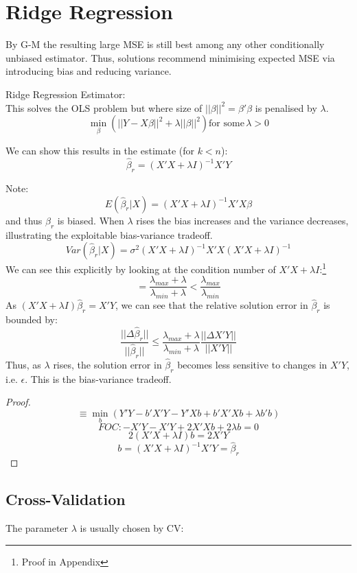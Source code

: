 \documentclass[DIV=14,titlepage=false]{scrreprt}
\begin{document}
\section{Ridge Regression}

By G-M the resulting large MSE is still best among any other conditionally unbiased estimator. Thus, solutions recommend minimising expected MSE via introducing bias and reducing variance.

\begin{definition}Ridge Regression Estimator: \\

    This solves the OLS problem but where size of \(||\beta||^2=\beta'\beta\) is penalised by \(\lambda\).
    \[\operatorname*{min}_{\beta}\left(||Y-X\beta||^2+\lambda||\beta||^2\right) \text{for some} \, \lambda > 0\]

    We can show this results in the estimate (for \(k< n\)):
    \[\hat{\beta}_{r}=(X'X+\lambda I)^{-1}X'Y\]

    Note: \[E(\hat{\beta}_{r}|X)=(X'X+\lambda I)^{-1}X'X\beta\] and thus \(\hat{\beta}_{r}\) is biased. When \(\lambda\) rises the bias increases and the variance decreases, illustrating the exploitable bias-variance tradeoff.
    \[Var(\hat{\beta}_{r}|X)=\sigma^2(X'X+\lambda I)^{-1}X'X(X'X+\lambda I)^{-1}\]
    We can see this explicitly by looking at the condition number of \(X'X+\lambda I\):\footnote[3]{Proof in Appendix}
    \[= \frac{\lambda_{max}+\lambda}{\lambda_{min}+\lambda}<\frac{\lambda_{max}}{\lambda_{min}}\]
    As \((X'X+\lambda I)\hat{\beta}_{r}=X'Y\), we can see that the relative solution error in \(\hat{\beta}_{r}\) is bounded by:
    \[\frac{||\Delta \hat{\beta}_{r}||}{||\hat{\beta}_{r}||} \leq \frac{\lambda_{max}+\lambda}{\lambda_{min}+\lambda}\frac{||\Delta X'Y||}{||X'Y||}\]
    Thus, as \(\lambda\) rises, the solution error in \(\hat{\beta}_{r}\) becomes less sensitive to changes in \(X'Y\), i.e. \(\epsilon\). This is the bias-variance tradeoff.
\end{definition}

\vspace{5mm}
\begin{proof}
     \[\equiv \operatorname*{min}_b (Y'Y - b'X'Y - Y'Xb + b'X'Xb + \lambda b'b)\]
     \[FOC: -X'Y-X'Y+2X'Xb+2\lambda b=0\]
     \[2(X'X+\lambda I)b=2X'Y\]
     \[b=(X'X+\lambda I)^{-1}X'Y=\hat{\beta}_r\]
\end{proof}

\subsection{Cross-Validation}
The parameter \(\lambda\) is usually chosen by CV:
\end{document}
